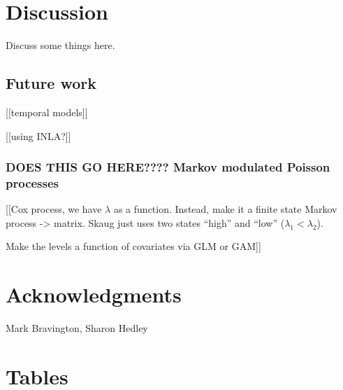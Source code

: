 \documentclass[a4paper,12pt]{article}
\begin{document}
\section*{Discussion}
\label{s:discussion}

Discuss some things here.


\subsection*{Future work}

[[temporal models]]

[[using INLA?]]

\subsubsection*{DOES THIS GO HERE???? Markov modulated Poisson processes}

[[Cox process, we have $\lambda$ as a function. 
Instead, make it a finite state Markov process -> matrix.
Skaug just uses two states ``high'' and ``low'' ($\lambda_1< \lambda_2$).

Make the levels a function of covariates via GLM or GAM]]






\section*{Acknowledgments}

Mark Bravington, Sharon Hedley


\newpage





\newpage


\section*{Tables}
\end{document}
